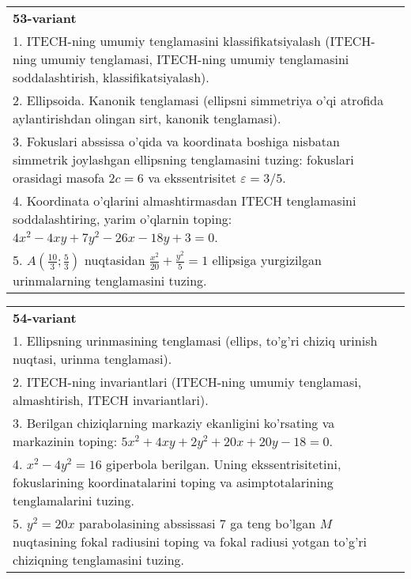 \documentclass{article}
\begin{document}
\begin{tabular}{m{17cm}}
\textbf{53-variant}\\
1. ITECH-ning umumiy tenglamasini klassifikatsiyalash (ITECH-ning umumiy tenglamasi, ITECH-ning umumiy tenglamasini soddalashtirish, klassifikatsiyalash).\\

2. Ellipsoida. Kanonik tenglamasi (ellipsni simmetriya o'qi atrofida aylantirishdan olingan sirt, kanonik tenglamasi).\\

3. Fokuslari abssissa o'qida va koordinata boshiga nisbatan simmetrik joylashgan ellipsning tenglamasini tuzing: fokuslari orasidagi masofa $2c=6$ va ekssentrisitet $\varepsilon=3/5$.\\

4. Koordinata o'qlarini almashtirmasdan ITECH tenglamasini soddalashtiring, yarim o'qlarnin toping: $4x^{2} - 4xy + 7y^{2} - 26x - 18y + 3 = 0$.\\

5. $A(\frac{10}{3};\frac{5}{3})$ nuqtasidan $\frac{x^{2}}{20} + \frac{y^{2}}{5} = 1$ ellipsiga yurgizilgan urinmalarning tenglamasini tuzing.  
\end{tabular}
\vspace{1cm}


\begin{tabular}{m{17cm}}
\textbf{54-variant}\\
1. Ellipsning urinmasining tenglamasi (ellips, to'g'ri chiziq urinish nuqtasi, urinma tenglamasi).\\

2. ITECH-ning invariantlari (ITECH-ning umumiy tenglamasi, almashtirish, ITECH invariantlari).\\

3. Berilgan chiziqlarning markaziy ekanligini ko'rsating va markazinin toping: $5x^{2}+4xy+2y^{2}+20x+20y-18=0$.\\

4. $x^{2} - 4y^{2} = 16$ giperbola berilgan. Uning ekssentrisitetini, fokuslarining koordinatalarini toping va asimptotalarining tenglamalarini tuzing.\\

5. $y^{2} = 20x$ parabolasining abssissasi 7 ga teng bo'lgan $M$ nuqtasining fokal radiusini toping va fokal radiusi yotgan to'g'ri chiziqning tenglamasini tuzing.  
\end{tabular}
\vspace{1cm}
\end{document}

